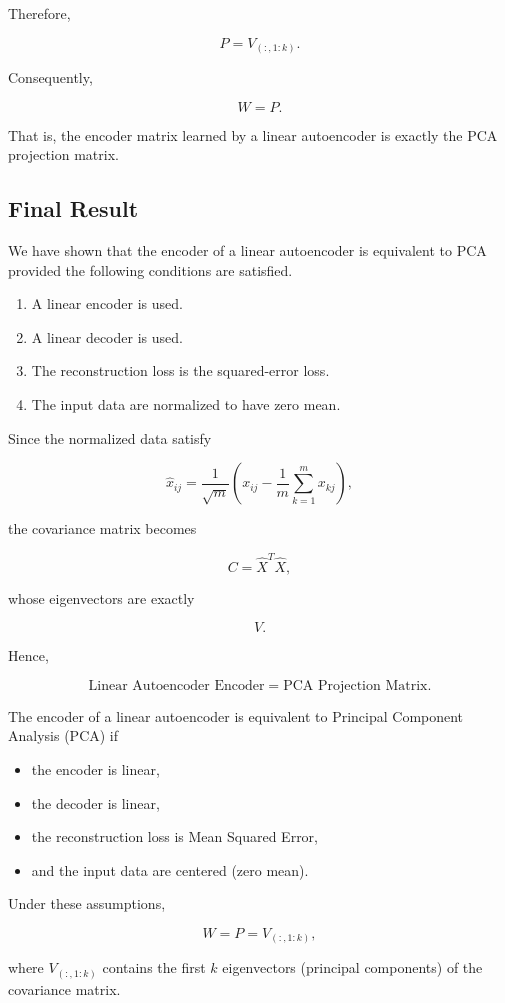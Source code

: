 \documentclass{article}
\begin{document}
Therefore,

\[
\boxed{
	P
	=
	V_{(:,1:k)}.
}
\]

Consequently,

\[
\boxed{
	W=P.
}
\]

That is, the encoder matrix learned by a linear autoencoder is exactly the PCA
projection matrix.

\subsection{Final Result}

We have shown that the encoder of a linear autoencoder is equivalent to PCA
provided the following conditions are satisfied.

\begin{enumerate}
	\item A linear encoder is used.
	\item A linear decoder is used.
	\item The reconstruction loss is the squared-error loss.
	\item The input data are normalized to have zero mean.
\end{enumerate}

Since the normalized data satisfy

\[
\boxed{
	\hat{x}_{ij}
	=
	\frac{1}{\sqrt{m}}
	\left(
	x_{ij}
	-
	\frac1m
	\sum_{k=1}^{m}
	x_{kj}
	\right),
}
\]

the covariance matrix becomes

\[
\boxed{
	C
	=
	\hat{X}^{T}\hat{X},
}
\]

whose eigenvectors are exactly

\[
\boxed{
	V.
}
\]

Hence,

\[
\boxed{
	\text{Linear Autoencoder Encoder}
	=
	\text{PCA Projection Matrix}.
}
\]

\begin{tcolorbox}[title=Important Result,colback=blue!5,colframe=blue!60]
	
	The encoder of a linear autoencoder is equivalent to Principal Component
	Analysis (PCA) if
	
	\begin{itemize}
		\item the encoder is linear,
		\item the decoder is linear,
		\item the reconstruction loss is Mean Squared Error,
		\item and the input data are centered (zero mean).
	\end{itemize}
	
	Under these assumptions,
	
	\[
	\boxed{
		W=P=V_{(:,1:k)},
	}
	\]
	
	where $V_{(:,1:k)}$ contains the first $k$ eigenvectors (principal components)
	of the covariance matrix.
	
\end{tcolorbox}
\end{document}
